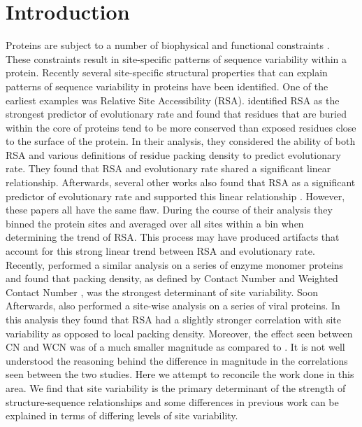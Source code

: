 \documentclass[12pt]{article}
\begin{document}
\section{Introduction}
\label{sec:intro}

Proteins are subject to a number of biophysical and functional constraints \citep{Scherreretal2012, Wilkeetal2010}. These constraints result in site-specific patterns of sequence variability within a protein. Recently several site-specific structural properties that can explain patterns of sequence variability in proteins have been identified. One of the earliest examples was Relative Site Accessibility (RSA). \cite{Fransozaetal2009} identified RSA as the strongest predictor of evolutionary rate and found that residues that are buried within the core of proteins tend to be more conserved than exposed residues close to the surface of the protein. In their analysis, they considered the ability of both RSA and various definitions of residue packing density to predict evolutionary rate. They found that RSA and evolutionary rate shared a significant linear relationship. Afterwards, several other works  also found that RSA as a significant predictor of evolutionary rate and supported this linear relationship \citep{Ramseyetal2011, Scherreretal2012}. However, these papers all have the same flaw. During the course of their analysis they binned the protein sites and averaged over all sites within a bin when determining the trend of RSA. This process may have produced artifacts that account for this strong linear trend between RSA and evolutionary rate. \\
\indent Recently, \cite{Yehetal2014} performed a similar analysis on a series of enzyme monomer proteins and found that packing density, as defined by Contact Number and Weighted Contact Number \citep{Liaoetal2005, Yehetal2014, Huangetal2014}, was the strongest determinant of site variability.  Soon Afterwards, \cite{Shahmoradietal2014} also performed a site-wise analysis on a series of viral proteins. In this analysis they found that RSA had a slightly stronger correlation with site variability as opposed to local packing density.  Moreover, the effect seen between CN and WCN was of a much smaller magnitude as compared to \cite{Yehetal2014}. It is not well understood the reasoning behind the difference in magnitude in the correlations seen between the two studies. Here we attempt to reconcile the work done in this area. We find that site variability is the primary determinant of the strength of structure-sequence relationships and some differences in previous work can be explained in terms of differing levels of site variability. \\
\end{document}
